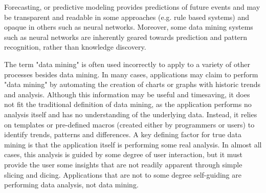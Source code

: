 \documentclass[11pt]{article} %
\begin{document}
Forecasting, or predictive modeling provides predictions of future events and may be transparent and readable in some approaches (e.g. rule based systems) and opaque in others such as neural networks. Moreover, some data mining systems such as neural networks are inherently geared towards prediction and pattern recognition, rather than knowledge discovery.



The term "data mining" is often used incorrectly to apply to a variety of other processes besides data mining. In many cases, applications may claim to perform "data mining" by automating the creation of charts or graphs with historic trends and analysis. Although this information may be useful and timesaving, it does not fit the traditional definition of data mining, as the application performs no analysis itself and has no understanding of the underlying data. Instead, it relies on templates or pre-defined macros (created either by programmers or users) to identify trends, patterns and differences. A key defining factor for true data mining is that the application itself is performing some real analysis. In almost all cases, this analysis is guided by some degree of user interaction, but it must provide the user some insights that are not readily apparent through simple slicing and dicing. Applications that are not to some degree self-guiding are performing data analysis, not data mining.
\end{document}
